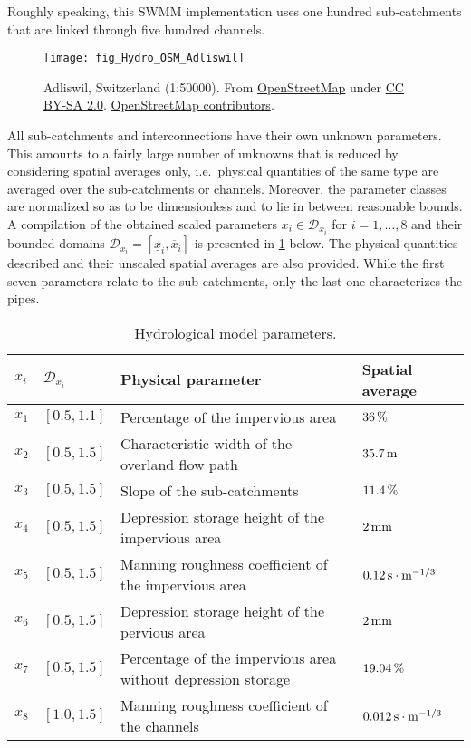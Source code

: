 Roughly speaking, this SWMM implementation uses one hundred sub-catchments that are linked through five hundred channels.
\begin{figure}[htbp]
  \centering
  \texttt{[image: fig\_Hydro\_OSM\_Adliswil]}
  \caption[Adliswil, Switzerland (1:50000)]{Adliswil, Switzerland (1:50000).
           From \href{https://www.openstreetmap.org}{OpenStreetMap} under \href{https://creativecommons.org/licenses/by-sa/2.0/}{CC BY-SA 2.0}.
           \textcopyright{} \href{https://www.openstreetmap.org/copyright}{OpenStreetMap contributors}.}
  \label{fig:Hydro:OSM:Adliswil}
\end{figure}
\par %
All sub-catchments and interconnections have their own unknown parameters.
This amounts to a fairly large number of unknowns that is reduced by considering spatial averages only,
i.e.\ physical quantities of the same type are averaged over the sub-catchments or channels.
Moreover, the parameter classes are normalized so as to be dimensionless and to lie in between reasonable bounds.
A compilation of the obtained scaled parameters \(x_i \in \mathcal{D}_{x_i}\) for \(i=1,\ldots,8\)
and their bounded domains \(\mathcal{D}_{x_i} = [\underline{x}_i,\overline{x}_i]\) is presented in \cref{tab:Hydro:Parameters} below.
The physical quantities described and their unscaled spatial averages are also provided.
While the first seven parameters relate to the sub-catchments, only the last one characterizes the pipes.
\begin{table}[htbp]
  \caption[Hydrological model parameters]{Hydrological model parameters.}
  \label{tab:Hydro:Parameters}
  \centering
  \begin{tabular}{llll}
    \toprule
    \(x_i\) & \(\mathcal{D}_{x_i}\) & Physical parameter & Spatial average \\
    \midrule
    \(x_1\) & \([0.5,1.1]\) & Percentage of the impervious area                            & \(\unit[36]{\%}\) \\
    \(x_2\) & \([0.5,1.5]\) & Characteristic width of the overland flow path               & \(\unit[35.7]{m}\) \\
    \(x_3\) & \([0.5,1.5]\) & Slope of the sub-catchments                                  & \(\unit[11.4]{\%}\) \\
    \(x_4\) & \([0.5,1.5]\) & Depression storage height of the impervious area             & \(\unit[2]{mm}\) \\
    \(x_5\) & \([0.5,1.5]\) & Manning roughness coefficient of the impervious area         & \(\unit[0.12]{s \cdot m^{-1/3}}\) \\
    \(x_6\) & \([0.5,1.5]\) & Depression storage height of the pervious area               & \(\unit[2]{mm}\) \\
    \(x_7\) & \([0.5,1.5]\) & Percentage of the impervious area without depression storage & \(\unit[19.04]{\%}\) \\
    \(x_8\) & \([1.0,1.5]\) & Manning roughness coefficient of the channels                & \(\unit[0.012]{s \cdot m^{-1/3}}\) \\
    \bottomrule
  \end{tabular}
\end{table}
